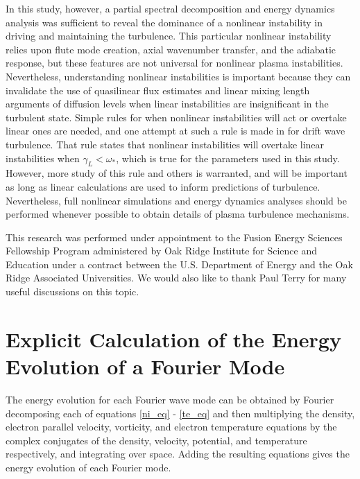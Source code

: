 \documentclass[showpacs,preprintnumbers,amsmath,amssymb,superscriptaddress]{revtex4}
\begin{document}
In this study, however, a partial spectral decomposition and energy dynamics analysis was sufficient to reveal the dominance of a nonlinear instability in driving and maintaining the turbulence. 
This particular nonlinear instability relies upon flute mode creation, axial wavenumber transfer, and the adiabatic response, but these features are not universal for nonlinear
plasma instabilities. Nevertheless,
understanding nonlinear instabilities is important because they can invalidate the use of quasilinear flux estimates and linear mixing length arguments of diffusion 
levels when linear instabilities are insignificant in the turbulent state. Simple rules for when nonlinear instabilities will act or overtake linear ones are needed, and one attempt at such
a rule is made in \cite{scott2005} for drift wave turbulence. That rule states that nonlinear instabilities will overtake linear instabilities when $\gamma_L < \omega_*$, which is true
for the parameters used in this study. However, more study of this rule and others is warranted, and will be important as long as linear calculations are used to inform predictions of turbulence.
Nevertheless, full nonlinear simulations and energy dynamics analyses should be performed whenever possible to obtain details of plasma turbulence mechanisms.


\begin{acknowledgements}
This research was performed under appointment to the Fusion Energy Sciences Fellowship Program administered by Oak Ridge Institute for
Science and Education under a contract between the U.S. Department of Energy and the Oak Ridge Associated Universities. We would also like to thank Paul Terry for many
useful discussions on this topic.
\end{acknowledgements}



\appendix

\section{Explicit Calculation of the Energy Evolution of a Fourier Mode}

The energy evolution for each Fourier wave mode can be obtained by Fourier decomposing each of equations \ref{ni_eq} - \ref{te_eq}
and then multiplying the density, electron parallel velocity, vorticity, and electron temperature equations by the complex conjugates of the 
density, velocity, potential, and temperature respectively, and integrating over space.
Adding the resulting equations gives the energy evolution of each Fourier mode.
\end{document}
